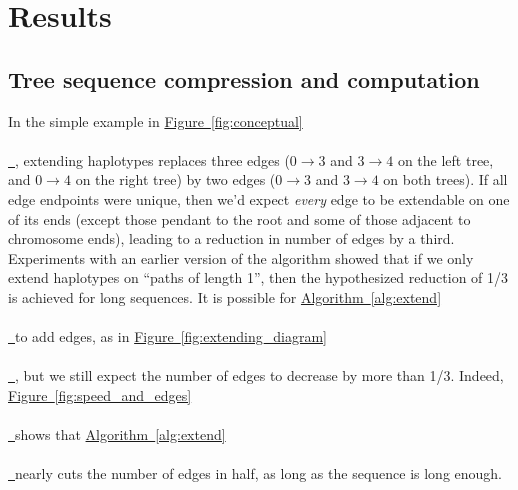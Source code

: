 \documentclass[10pt,twoside,lineno]{gsajnl}
\newcommand{\algorithmref}[2][]{%
	\hyperref[{#2}]{%
		Algorithm~\ref*{#2}%
		\ifx\\#1\\%
		\else
		\,#1%
		\fi
	}%
}
\newcommand*{\figref}[2][]{%
	\hyperref[{#2}]{%
		Figure~\ref*{#2}%
		\ifx\\#1\\%
		\else
		\,#1%
		\fi
	}%
}
\begin{document}
\section{Results}



\subsection{Tree sequence compression and computation}


In the simple example in \figref{fig:conceptual},
extending haplotypes replaces three edges
($0 \to 3$ and $3 \to 4$ on the left tree, and $0 \to 4$ on the right tree)
by two edges ($0 \to 3$ and $3 \to 4$ on both trees).
If all edge endpoints were unique, then we'd expect \emph{every} edge to be extendable
on one of its ends
(except those pendant to the root and some of those adjacent to chromosome ends),
leading to a reduction in number of edges by a third.
Experiments with an earlier version of the algorithm showed that
if we only extend haplotypes on ``paths of length 1'', 
then the hypothesized reduction of 1/3 is achieved for long sequences. %
It is possible for \algorithmref{alg:extend} to add edges, as in \figref{fig:extending_diagram},
but we still expect the number of edges to decrease by more than 1/3.
Indeed,
\figref{fig:speed_and_edges} shows that \algorithmref{alg:extend} nearly cuts the number of edges
in half, as long as the sequence is long enough.
\end{document}
